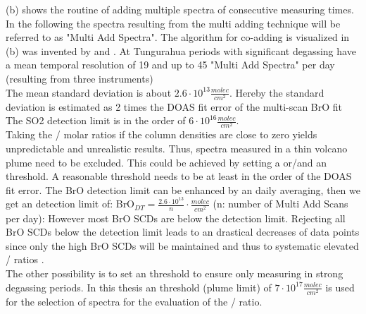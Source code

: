  (b) shows the routine of adding multiple spectra of consecutive measuring times. In the following the spectra resulting from the multi adding technique will be referred to as "Multi Add Spectra". The algorithm for co-adding is visualized in  (b) was invented by \citet{vogel2011volcanic} and \citet{lubcke2014bro}. At Tungurahua periods with significant degassing have a mean temporal resolution of 19 and up to 45 "Multi Add Spectra" per day (resulting from three instruments)\\

The mean standard deviation is about $2.6\cdot10^{13} \frac{molec}{cm^{2}}$. Hereby the standard deviation is estimated as 2 times the DOAS fit error of the multi-scan BrO fit \citet{Stutz:96} \\

The SO2	detection limit is in the order of $6\cdot10^{16}\frac{molec}{cm^{2}}$.\\
%
Taking the / molar ratios if the column densities are close to zero yields unpredictable and unrealistic results. 
Thus, spectra measured in a thin volcano plume need to be excluded.
This could be achieved by setting a  or/and an  threshold. A reasonable  threshold needs to be at least in the order of the DOAS fit error. The BrO detection limit can be enhanced by an daily averaging, then we get an detection limit of: BrO$_{DT}=\frac{2.6\cdot10^{13}}{n}\cdot\frac{molec}{cm^{2}}$ (n: number of Multi Add Scans per day): However most BrO SCDs are below the detection limit.
Rejecting all BrO SCDs below the detection limit leads to an drastical decreases of data points since only the high BrO SCDs will be maintained and thus to systematic elevated / ratios  \citep{lubcke2014bro}.\\

%
The other possibility is to set an  threshold to ensure only measuring in strong degassing periods. In this thesis an  threshold (plume limit) of $7\cdot 10^{17} \frac{molec}{cm^2}$ is used for the selection of spectra for the evaluation of the / ratio. 

